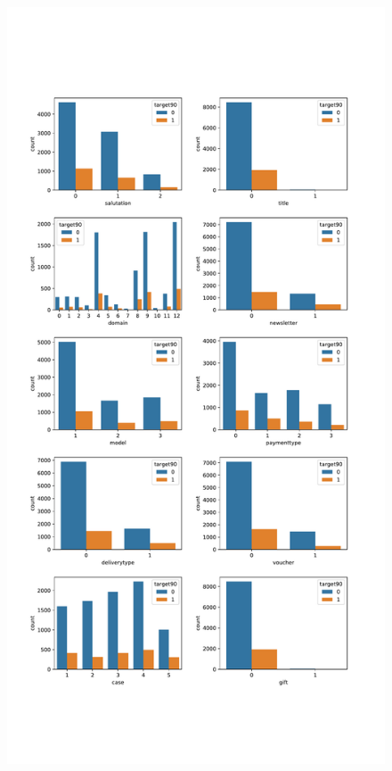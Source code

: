 \begin{figure}[!htbp]
\begin{center}
\includegraphics[scale=0.5]{pdf/distCategorical.pdf}
\end{center}
\label{fig:distC}
\end{figure}
